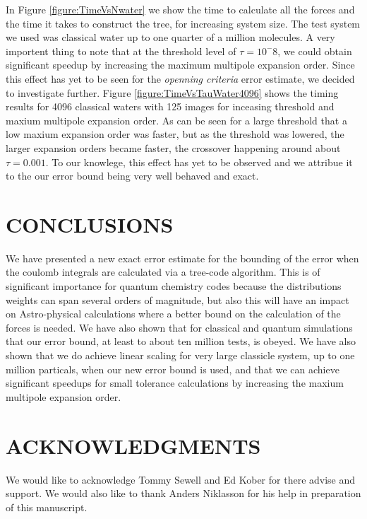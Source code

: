 \documentclass[prb,aps,nobibnotes,superbib,preprint]{revtex4}
\begin{document}
In Figure \ref{figure:TimeVsNwater} we show the time to calculate all the forces and the time it takes
to construct the tree, for increasing system size. The test system we used was classical water up to one quarter of a 
million molecules. A very importent thing to note that at the  threshold level of $\tau=10^-8$, 
we could obtain significant speedup by increasing the maximum multipole expansion order. Since this effect has 
yet to be seen for the {\it openning criteria} error estimate, 
we decided to investigate further. Figure \ref{figure:TimeVsTauWater4096} shows the timing results for 4096 classical waters 
with 125 images for inceasing threshold and maxium multipole expansion order. As can be seen for a large threshold that
a low maxium expansion order was faster, but as the threshold was lowered, the larger expansion orders became faster, the
crossover happening around about $\tau=0.001$. To our knowlege, this effect has yet to be observed and we attribue it to
the our error bound being very well behaved and exact. 


\section{CONCLUSIONS}

We have presented a new exact error estimate for the bounding of the error when the coulomb
integrals are calculated via a tree-code algorithm. This is of significant importance 
for quantum chemistry codes because the distributions 
weights can span several orders of magnitude, but also this will have an impact on Astro-physical calculations
where a better bound on the calculation of the forces is needed. We have also shown that for classical and 
quantum simulations that our error bound, at least to about ten million tests, is obeyed. 
We have also shown that we do achieve linear scaling for very large classicle system, up to one million particals, 
when  our new error bound is used, and that we can achieve significant speedups for small tolerance calculations 
by increasing the maxium multipole expansion order. 

\section*{ACKNOWLEDGMENTS}

We would like to acknowledge Tommy Sewell and Ed Kober for there advise
and support. We would also like to thank Anders Niklasson for his help
in preparation of this manuscript. 
\end{document}
